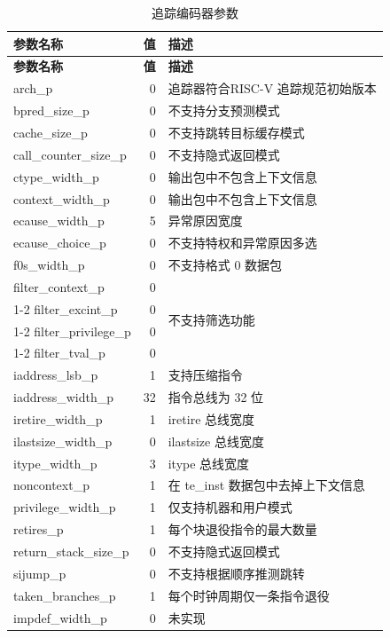 \documentclass[main\_\_CN.tex]{subfiles}
\begin{document}
\begin{longtable}[c]{ |l|r|l| }
    \caption{追踪编码器参数}
    \label{tab:encoder_parameters}
    \\\hline\rowcolor{lightgray}
    \textbf{参数名称} & \textbf{值} & \textbf{描述} \\\hline
    \endfirsthead
    \textbf{参数名称} & \textbf{值} & \textbf{描述} \\\hline
    \endhead
    \endfoot
    \endlastfoot

    arch\_p & 0 & 追踪器符合RISC-V 追踪规范初始版本  \\\hline
    bpred\_size\_p & 0 & 不支持分支预测模式 \\\hline
    cache\_size\_p & 0 & 不支持跳转目标缓存模式 \\\hline
    call\_counter\_size\_p & 0 & 不支持隐式返回模式 \\\hline
    ctype\_width\_p & 0 & 输出包中不包含上下文信息 \\\hline
    context\_width\_p & 0 & 输出包中不包含上下文信息 \\\hline
    ecause\_width\_p & 5 & 异常原因宽度 \\\hline
    ecause\_choice\_p & 0 & 不支持特权和异常原因多选 \\\hline
    f0s\_width\_p & 0 & 不支持格式 0 数据包 \\\hline
    filter\_context\_p & 0 & \multirow{4}{*}{不支持筛选功能} \\\cline{1-2}
    filter\_excint\_p & 0 &  \\\cline{1-2}
    filter\_privilege\_p & 0 &  \\\cline{1-2}
    filter\_tval\_p & 0 &  \\\hline
    iaddress\_lsb\_p & 1 & 支持压缩指令 \\\hline
    iaddress\_width\_p & 32 & 指令总线为 32 位 \\\hline
    iretire\_width\_p & 1 & iretire 总线宽度 \\\hline
    ilastsize\_width\_p & 0 & ilastsize 总线宽度 \\\hline
    itype\_width\_p & 3 & itype 总线宽度  \\\hline
    noncontext\_p & 1 & 在 te\_inst 数据包中去掉上下文信息 \\\hline
    privilege\_width\_p & 1 & 仅支持机器和用户模式 \\\hline
    retires\_p & 1 & 每个块退役指令的最大数量 \\\hline
    return\_stack\_size\_p & 0 & 不支持隐式返回模式 \\\hline
    sijump\_p & 0 & 不支持根据顺序推测跳转 \\\hline
    taken\_branches\_p & 1 & 每个时钟周期仅一条指令退役 \\\hline
    impdef\_width\_p & 0 & 未实现 \\\hline

 \end{longtable}
\end{document}
